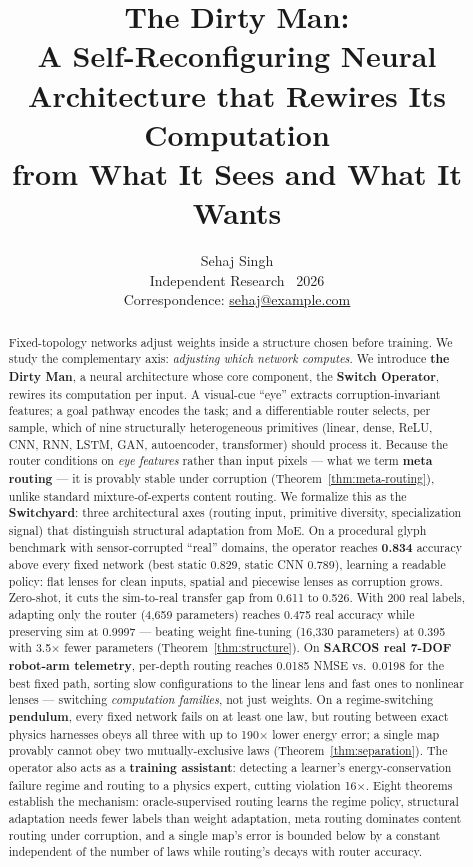 \documentclass[11pt,a4paper]{article}
\title{\bfseries The Dirty Man:\\A Self-Reconfiguring Neural Architecture that Rewires Its Computation\\from What It Sees and What It Wants}
\author{Sehaj Singh\\[2pt]
\small Independent Research \textbullet\ 2026\\
\small Correspondence: \url{sehaj@example.com}}
\date{}
\begin{document}
\maketitle

\begin{abstract}
\noindent
Fixed-topology networks adjust weights inside a structure chosen before training. We study the complementary axis: \emph{adjusting which network computes}. We introduce \textbf{the Dirty Man}, a neural architecture whose core component, the \textbf{Switch Operator}, rewires its computation per input. A visual-cue ``eye'' extracts corruption-invariant features; a goal pathway encodes the task; and a differentiable router selects, per sample, which of nine structurally heterogeneous primitives (linear, dense, ReLU, CNN, RNN, LSTM, GAN, autoencoder, transformer) should process it. Because the router conditions on \emph{eye features} rather than input pixels --- what we term \textbf{meta routing} --- it is provably stable under corruption (Theorem~\ref{thm:meta-routing}), unlike standard mixture-of-experts content routing. We formalize this as the \textbf{Switchyard}: three architectural axes (routing input, primitive diversity, specialization signal) that distinguish structural adaptation from MoE. On a procedural glyph benchmark with sensor-corrupted ``real'' domains, the operator reaches \textbf{0.834} accuracy above every fixed network (best static 0.829, static CNN 0.789), learning a readable policy: flat lenses for clean inputs, spatial and piecewise lenses as corruption grows. Zero-shot, it cuts the sim-to-real transfer gap from 0.611 to 0.526. With 200 real labels, adapting only the router (4{,}659 parameters) reaches 0.475 real accuracy while preserving sim at 0.9997 --- beating weight fine-tuning (16{,}330 parameters) at 0.395 with 3.5$\times$ fewer parameters (Theorem~\ref{thm:structure}). On \textbf{SARCOS real 7-DOF robot-arm telemetry}, per-depth routing reaches 0.0185 NMSE vs.\ 0.0198 for the best fixed path, sorting slow configurations to the linear lens and fast ones to nonlinear lenses --- switching \emph{computation families}, not just weights. On a regime-switching \textbf{pendulum}, every fixed network fails on at least one law, but routing between exact physics harnesses obeys all three with up to 190$\times$ lower energy error; a single map provably cannot obey two mutually-exclusive laws (Theorem~\ref{thm:separation}). The operator also acts as a \textbf{training assistant}: detecting a learner's energy-conservation failure regime and routing to a physics expert, cutting violation 16$\times$. Eight theorems establish the mechanism: oracle-supervised routing learns the regime policy, structural adaptation needs fewer labels than weight adaptation, meta routing dominates content routing under corruption, and a single map's error is bounded below by a constant independent of the number of laws while routing's decays with router accuracy.
\end{abstract}
\end{document}
